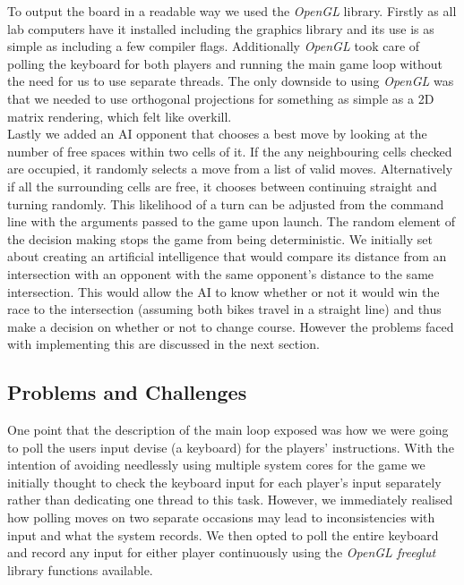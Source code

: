 \documentclass[11pt]{article}
\begin{document}
To output the board in a readable way we used the \textit{OpenGL} library. Firstly as all lab computers have it installed including the graphics library and its use is as simple as including a few compiler flags. Additionally \textit{OpenGL} took care of polling the keyboard for both players and running the main game loop without the need for us to use separate threads. The only downside to using \textit{OpenGL} was that we needed to use orthogonal projections for something as simple as a 2D matrix rendering, which felt like overkill. \\

Lastly we added an AI opponent that chooses a best move by looking at the number of free spaces within two cells of it. If the any neighbouring cells checked are occupied, it randomly selects a move from a list of valid moves. Alternatively if all the surrounding cells are free, it chooses between continuing straight and turning randomly. This likelihood of a turn can be adjusted from the command line with the arguments passed to the game upon launch. The random element of the decision making stops the game from being deterministic. We initially set about creating an artificial intelligence that would compare its distance from an intersection with an opponent with the same opponent's distance to the same intersection. This would allow the AI to know whether or not it would win the race to the intersection (assuming both bikes travel in a straight line) and thus make a decision on whether or not to change course. However the problems faced with implementing this are discussed in the next section.\par


\subsection{Problems and Challenges}
One point that the description of the main loop exposed was how we were going to poll the users input devise (a keyboard) for the players' instructions. With the intention of avoiding needlessly using multiple system cores for the game we initially thought to check the keyboard input for each player's input separately rather than dedicating one thread to this task. However, we immediately realised how polling moves on two separate occasions may lead to inconsistencies with input and what the system records. We then opted to poll the entire keyboard and record any input for either player continuously using the \textit{OpenGL freeglut} library functions available. \par
\end{document}
